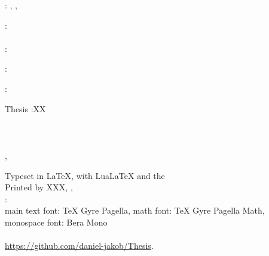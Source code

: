 \thispagestyle{empty}

\hfill

\vfill

\noindent\myName: \textit{\myTitle}, \mySubtitle, %
\textcopyright\ ~

\bigskip

\noindent{}: \\
\myProf \\

\noindent{}: \\
\myCollaborator


\noindent{}:\\
\myExaminer

\noindent{}:\\
\HoS

\bigskip
\noindent\myDegree Thesis :XX\\
\noindent\myDepartment\\
\noindent\myFaculty\\
\noindent\myUni\\
\noindent\myLocation, \myCountry

\vfill


\medskip
\noindent Typeset in \LaTeX, with Lua\LaTeX\xspace and the \ctVersion\\
\noindent Printed by XXX, , \myPrintLocation\\
\noindent{}: \\
\noindent main text font: TeX Gyre Pagella, math font: TeX Gyre Pagella Math, monospace font: Bera Mono\\
\noindent{}\\
\url{https://github.com/daniel-jakob/Thesis}.
